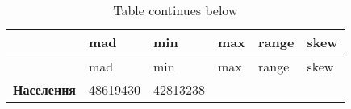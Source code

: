 \documentclass[
]{article}
\begin{document}
\begin{longtable}[]{@{}llllll@{}}
\caption{Table continues below}\tabularnewline
\toprule
\begin{minipage}[b]{0.19\columnwidth}\raggedright
~\strut
\end{minipage} & \begin{minipage}[b]{0.13\columnwidth}\raggedright
mad\strut
\end{minipage} & \begin{minipage}[b]{0.13\columnwidth}\raggedright
min\strut
\end{minipage} & \begin{minipage}[b]{0.14\columnwidth}\raggedright
max\strut
\end{minipage} & \begin{minipage}[b]{0.14\columnwidth}\raggedright
range\strut
\end{minipage} & \begin{minipage}[b]{0.10\columnwidth}\raggedright
skew\strut
\end{minipage}\tabularnewline
\midrule
\endfirsthead
\toprule
\begin{minipage}[b]{0.19\columnwidth}\raggedright
~\strut
\end{minipage} & \begin{minipage}[b]{0.13\columnwidth}\raggedright
mad\strut
\end{minipage} & \begin{minipage}[b]{0.13\columnwidth}\raggedright
min\strut
\end{minipage} & \begin{minipage}[b]{0.14\columnwidth}\raggedright
max\strut
\end{minipage} & \begin{minipage}[b]{0.14\columnwidth}\raggedright
range\strut
\end{minipage} & \begin{minipage}[b]{0.10\columnwidth}\raggedright
skew\strut
\end{minipage}\tabularnewline
\midrule
\endhead
\begin{minipage}[t]{0.19\columnwidth}\raggedright
\textbf{Населення}\strut
\end{minipage} & \begin{minipage}[t]{0.13\columnwidth}\raggedright
48619430\strut
\end{minipage} & \begin{minipage}[t]{0.13\columnwidth}\raggedright
42813238\strut
\end{minipage} & \begin{minipage}[t]{0.14\columnwidth}\raggedright

\end{minipage}
\end{longtable}
\end{document}

